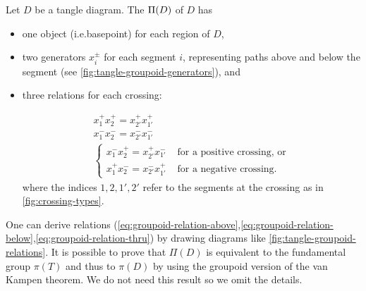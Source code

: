 \documentclass[leqno]{sl2art}
\begin{document}
\begin{definition}
  \label{def:tangle-groupoid}
  Let \(D\) be a tangle diagram.
  The  \(\Pi\mathopen{}\left(D\right)\) of \(D\) has
  \begin{itemize}
    \item one object (i.e.\@ basepoint) for each  region of \(D\),
    \item two generators \(x_i^{\pm}\) for each segment \(i\), representing paths above and below the segment (see \cref{fig:tangle-groupoid-generators}), and
    \item three relations for each crossing:

  \begin{marginfigure}
    
    \caption{Deriving the middle relation at a crossing.}
    \label{fig:tangle-groupoid-relations}
  \end{marginfigure}

  \begin{gather}
    \label{eq:groupoid-relation-above}
    x_1^+ x_2^+ = x_{2'}^+ x_{1'}^+
    \\
    \label{eq:groupoid-relation-below}
    x_1^- x_2^- = x_{2'}^- x_{1'}^-
    \\
    \label{eq:groupoid-relation-thru}
    \begin{cases}
      x_1^{-} x_{2}^{+}
      =
      x_{2'}^{+} x_{1'}^{-}
      &
      \text{ for a positive crossing, or}
      \\
      x_1^{+} x_{2}^{-}
      =
      x_{2'}^{-} x_{1'}^{+}
      &
      \text{ for a negative crossing.} 
    \end{cases}
  \end{gather}
  where the indices \(1,2, 1', 2'\) refer to the segments at the crossing as in \cref{fig:crossing-types}.
  \end{itemize}

\end{definition}

One can derive relations (\ref{eq:groupoid-relation-above},\ref{eq:groupoid-relation-below},\ref{eq:groupoid-relation-thru}) by drawing diagrams like \cref{fig:tangle-groupoid-relations}.
It is possible to prove that \(\Pi(D)\) is equivalent to the fundamental group \(\pi(T)\) and thus to \(\pi(D)\) by using the groupoid version \cite[Chapter 9]{Brown2006} of the van Kampen theorem.
We do not need this result so we omit the details.
\end{document}
